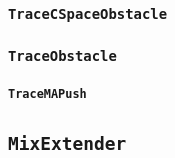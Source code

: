 \subsubsection{\texttt{TraceCSpaceObstacle}}

\subsubsection{\texttt{TraceObstacle}}

\paragraph{\texttt{TraceMAPush}}

\subsection{\texttt{MixExtender}}

